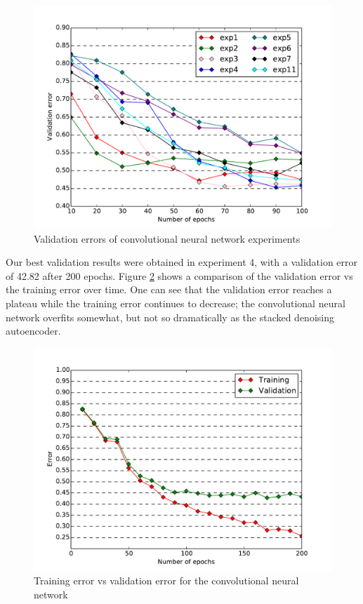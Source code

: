 \documentclass{acm_proc_article-sp}
\begin{document}
\begin{figure}[h!]
\includegraphics[width=\linewidth]{convnet_compare.pdf}
		\caption{Validation errors of convolutional neural network experiments}
		\label{fig:convnet_compare}
\end{figure}

Our best validation results were obtained in experiment 4, with a validation error of 42.82 after 200 epochs. Figure \ref{fig:convnet_trainvsvalid} shows a comparison of the validation error vs the training error over time. One can see that the validation error reaches a plateau while the training error continues to decrease; the convolutional neural network overfits somewhat, but not so dramatically as the stacked denoising autoencoder.

\begin{figure}[h!]
\includegraphics[width=\linewidth]{convnet_learning.pdf}
		\caption{Training error vs validation error for the convolutional neural network}
		\label{fig:convnet_trainvsvalid}
\end{figure}
\end{document}

